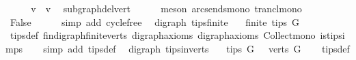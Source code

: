 \begin{isabellebody}
\ \ \isamarkupfalse%
\ \isamarkupfalse%
\ {\isachardoublequoteopen}v\ {\isasymrightarrow}\isactrlsup {\isacharplus}{\kern0pt}\ v{\isachardoublequoteclose}\ \isamarkupfalse%
\ subgraph{\isacharunderscore}{\kern0pt}del{\isacharunderscore}{\kern0pt}vert\isanewline
\ \ \ \ \isamarkupfalse%
\ {\isacharparenleft}{\kern0pt}meson\ arcs{\isacharunderscore}{\kern0pt}ends{\isacharunderscore}{\kern0pt}mono\ trancl{\isacharunderscore}{\kern0pt}mono{\isacharparenright}{\kern0pt}\ \isanewline
\ \ \isamarkupfalse%
\ \isamarkupfalse%
\ False\isanewline
\ \ \ \ \isamarkupfalse%
\ {\isacharparenleft}{\kern0pt}simp\ add{\isacharcolon}{\kern0pt}\ cycle{\isacharunderscore}{\kern0pt}free{\isacharparenright}{\kern0pt}\isanewline
{}\isamarkupfalse%
%
\endisatagproof
{\isafoldproof}%
%
\isadelimproof
\isanewline
%
\endisadelimproof
\isanewline
{}\isamarkupfalse%
\ {\isacharparenleft}{\kern0pt}\ digraph{\isacharparenright}{\kern0pt}\ tips{\isacharunderscore}{\kern0pt}finite{\isacharcolon}{\kern0pt}\isanewline
\ \ \ {\isachardoublequoteopen}finite\ {\isacharparenleft}{\kern0pt}tips\ G{\isacharparenright}{\kern0pt}{\isachardoublequoteclose}\isanewline
%
\isadelimproof
\ \ %
\endisadelimproof
%
\isatagproof
{}\isamarkupfalse%
\ tips{\isacharunderscore}{\kern0pt}def\ fin{\isacharunderscore}{\kern0pt}digraph{\isachardot}{\kern0pt}finite{\isacharunderscore}{\kern0pt}verts\ digraph{\isachardot}{\kern0pt}axioms{\isacharparenleft}{\kern0pt}{}{\isacharparenright}{\kern0pt}\ digraph{\isacharunderscore}{\kern0pt}axioms\ Collect{\isacharunderscore}{\kern0pt}mono\ is{\isacharunderscore}{\kern0pt}tip{\isachardot}{\kern0pt}simps\isanewline
\ \ \isamarkupfalse%
\ {\isacharparenleft}{\kern0pt}simp\ add{\isacharcolon}{\kern0pt}\ tips{\isacharunderscore}{\kern0pt}def{\isacharparenright}{\kern0pt}%
\endisatagproof
{\isafoldproof}%
%
\isadelimproof
\isanewline
%
\endisadelimproof
\isanewline
{}\isamarkupfalse%
\ {\isacharparenleft}{\kern0pt}\ digraph{\isacharparenright}{\kern0pt}\ tips{\isacharunderscore}{\kern0pt}in{\isacharunderscore}{\kern0pt}verts{\isacharcolon}{\kern0pt}\isanewline
\ \ \ {\isachardoublequoteopen}tips\ G\ {\isasymsubseteq}\ \ verts\ G{\isachardoublequoteclose}%
\isadelimproof
\ \ %
\endisadelimproof
%
\isatagproof
{}\isamarkupfalse%
\ tips{\isacharunderscore}{\kern0pt}def\isanewline
\ \ \isamarkupfalse%

\end{isabellebody}
